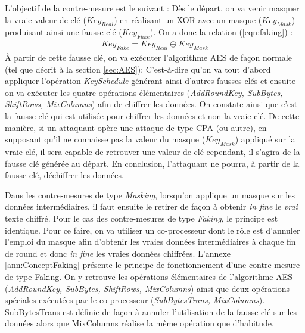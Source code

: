 \documentclass[10pt, oneside, a4paper]{article}
\begin{document}
\hspace{-0.5 cm}L'objectif de la contre-mesure est le suivant : Dès le départ, on va venir masquer la vraie valeur de clé ($Key_{Real}$) en réalisant un XOR avec un masque ($Key_{Mask}$) produisant ainsi une fausse clé ($Key_{Fake}$). On a donc la relation (\ref{eqn:faking}) : 
\begin{gather}
	Key_{Fake} = Key_{Real} \oplus Key_{Mask}\label{eqn:faking}
\end{gather}
À partir de cette fausse clé, on va exécuter l'algorithme AES de façon normale (tel que décrit à la section \ref{sec:AES}): C'est-à-dire qu'on va tout d'abord appliquer l'opération \textit{KeySchedule} générant ainsi d'autres fausses clés et ensuite on va exécuter les quatre opérations élémentaires (\textit{AddRoundKey, SubBytes, ShiftRows, MixColumns}) afin de chiffrer les données. On constate ainsi que c'est la fausse clé qui est utilisée pour chiffrer les données et non la vraie clé. De cette manière, si un attaquant opère une attaque de type CPA (ou autre), en supposant qu'il ne connaisse pas la valeur du masque ($Key_{Mask}$) appliqué sur la vraie clé, il sera capable de retrouver une valeur de clé cependant, il s'agira de la fausse clé générée au départ. En conclusion, l'attaquant ne pourra, à partir de la fausse clé, déchiffrer les données.

Dans les contre-mesures de type \textit{Masking}, lorsqu'on applique un masque sur les données intermédiaires, il faut ensuite le retirer de façon à obtenir \textit{in fine} le \textit{vrai} texte chiffré. Pour le cas des contre-mesures de type \textit{Faking}, le principe est identique. Pour ce faire, on va utiliser un co-processeur dont le rôle est d'annuler l'emploi du masque afin d'obtenir les vraies données intermédiaires à chaque fin de round et donc \textit{in fine} les vraies données chiffrées. L'annexe \ref{ann:ConceptFaking} présente le principe de fonctionnement d'une contre-mesure de type Faking. On y retrouve les opérations élémentaires de l'algorithme AES (\textit{AddRoundKey, SubBytes, ShiftRows, MixColumns}) ainsi que deux opérations spéciales exécutées par le co-processeur (\textit{SubBytesTrans, MixColumns}). SubBytesTrans est définie de façon à annuler l'utilisation de la fausse clé sur les données alors que MixColumns réalise la même opération que d'habitude. 
\end{document}
